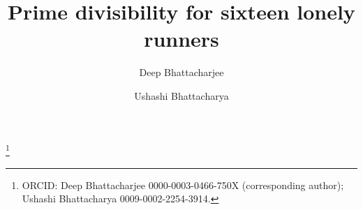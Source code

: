 \documentclass[11pt]{amsart}
\theoremstyle{definition}
\theoremstyle{remark}
\begin{document}
\title{Prime divisibility for sixteen lonely runners}

\author{Deep Bhattacharjee}
\address{Formerly, Electro-Gravitational Space Propulsion Laboratory (EGSPL),
Bhubaneswar, Odisha 751030, India; and formerly, University of Calcutta,
Senate House, 87/1 College Street, Kolkata 700073, West Bengal, India}
\thanks{ORCID: Deep Bhattacharjee 0000-0003-0466-750X (corresponding
author); Ushashi Bhattacharya 0009-0002-2254-3914.}

\author{Ushashi Bhattacharya}
\address{Formerly, National Taiwan University, Taipei 106319, Taiwan}

\date{\PAPERDATE}

\begin{abstract}
\itshape
\ABSTRACTTEXT
\end{abstract}

\maketitle

\setcounter{tocdepth}{1}
\tableofcontents
\end{document}
